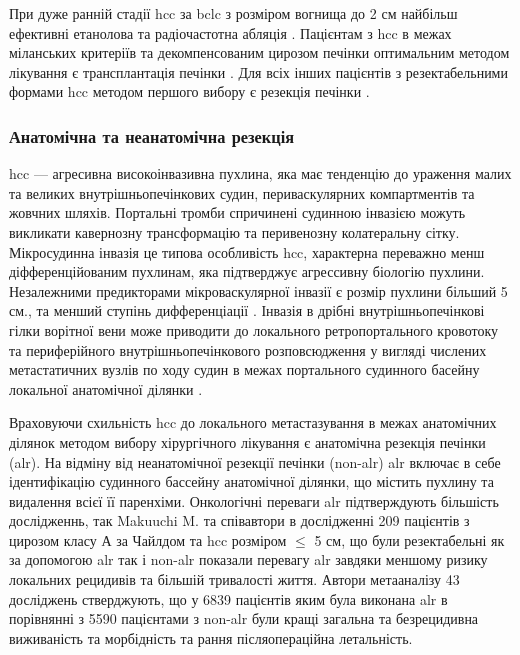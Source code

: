 \begin{refsection}
При дуже ранній стадії \acrshort{hcc} за \acrshort{bclc} з розміром вогнища до 2 см найбільш ефективні етанолова та радіочастотна абляція  \cite{Cucchetti2013}. Пацієнтам з \acrshort{hcc} в межах міланських критеріїв та декомпенсованим цирозом печінки оптимальним методом лікування є трансплантація печінки \cite{Colombo2016}. Для всіх інших пацієнтів з резектабельними формами \acrshort{hcc} методом першого вибору є резекція печінки \cite{Heimbach2018, Kudo2011}. 

\subsubsection{Анатомічна та неанатомічна резекція} 
\acrshort{hcc} --- агресивна високоінвазивна пухлина, яка має тенденцію до ураження малих та великих внутрішньопечінкових судин, периваскулярних компартментів та жовчних шляхів. Портальні тромби спричинені судинною інвазією можуть викликати кавернозну трансформацію та перивенозну колатеральну сітку. Мікросудинна інвазія це типова особливість \acrshort{hcc}, характерна переважно менш діфференційованим пухлинам, яка підтверджує агрессивну біологію пухлини. Незалежними предикторами мікроваскулярної інвазії є розмір пухлини більший 5 см., та менший ступінь дифференціації \cite{Zimmermann2017}. Інвазія в дрібні внутрішньопечінкові гілки ворітної вени може приводити до локального ретропортального кровотоку та периферійного внутрішньопечінкового розповсюдження у вигляді числених метастатичних вузлів по ходу судин в межах портального судинного басейну локальної анатомічної ділянки \cite{Kim2008}. 

Враховуючи схильність \acrshort{hcc} до локального метастазування в межах анатомічних ділянок методом вибору хірургічного лікування є анатомічна резекція печінки (\acrshort{alr}). На відміну від неанатомічної резекції печінки (\acrshort{non-alr}) \acrshort{alr} включає в себе ідентифікацію судинного бассейну анатомічної ділянки, що містить пухлину та видалення всієї її паренхіми. Онкологічні переваги \acrshort{alr} підтверждують більшість дослідженнь, так Makuuchi M. та співавтори \cite{Shindoh2016} в дослідженні 209 пацієнтів з цирозом класу А за Чайлдом та \acrshort{hcc} розміром $\leq$ 5 см, що були резектабельні як за допомогою \acrshort{alr} так і \acrshort{non-alr} показали перевагу \acrshort{alr} завдяки меншому ризику локальних рецидивів та більшій тривалості життя. Автори метааналізу \cite{Moris2018} 43 досліджень стверджують, що у 6839 пацієнтів яким була виконана \acrshort{alr} в порівнянні з 5590 пацієнтами з \acrshort{non-alr} були кращі загальна та безрецидивна виживаність та морбідність та рання післяопераційна летальність.


\end{refsection}

